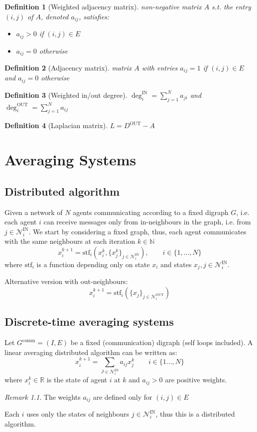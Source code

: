 \documentclass{book}
\newcommand{\R}{\mathbb{R}}
\newcommand{\N}{\mathbb{N}}
\theoremstyle{theoremv2}
\theoremstyle{defv2}
\newtheorem{definition}{Definition}[chapter]
\theoremstyle{remark}
\newtheorem*{remark}{Remark}
\theoremstyle{remark}
\theoremstyle{definition}
\theoremstyle{definition}
\begin{document}
\begin{definition}[Weighted adjacency matrix]
    non-negative matrix $A$ s.t. the entry $(i,j)$ of $A$, denoted $a_{ij}$, satisfies:
    \begin{itemize}
        \item $a_{ij} > 0$ if $(i,j)\in E$
        \item $a_{ij} = 0$ otherwise
    \end{itemize}
\end{definition}
\begin{definition}[Adjacency matrix]
    matrix $A$ with entries $a_{ij}=1$ if $(i,j)\in E$ and $a_{ij}=0$ otherwise
\end{definition}
\begin{definition}[Weighted in/out degree]
    $\deg_i^\text{IN} = \displaystyle\sum_{j=1}^{N} a_{ji}$ and $\deg_i^\text{OUT} = \displaystyle\sum_{j=1}^{N} a_{ij}$
\end{definition}
\begin{definition}[Laplacian matrix]
    $L = D^\text{OUT} - A$
\end{definition}

\chapter{Averaging Systems}
\section{Distributed algorithm}
Given a network of $N$ agents communicating according to a fixed digraph $G$, i.e. each agent $i$ can receive messages only from in-neighbours in the graph, i.e. from $j\in\mathcal{N}_i^{\text{IN}}$. 
We start by considering a fixed graph, thus, each agent communicates with the same neighbours at each iteration $k\in\N$
\[
    x_i^{k+1}=\text{stf}_i(x_i^k,\{x_j^k\}_{j\in\mathcal{N}_i^{\text{IN}}}), \qquad i\in\{1,\dots,N\}
\]
where $\text{stf}_i$ is a function depending only on state $x_i$ and states $x_j,j\in\mathcal{N}_i^{\text{IN}}$.

Alternative version with out-neighbours:
\[
    x_i^{k+1}=\text{stf}_i(\{x_j\}_{j\in\mathcal{N}_i^{\text{OUT}}})
\]
\section{Discrete-time averaging systems}
Let $G^{\text{comm}}=(I,E)$ be a fixed (communication) digraph (self loops included). A linear averaging distributed algorithm can be written as:
\[
    x_i^{k+1}=\displaystyle\sum_{J\in\mathcal{N}_i^{\text{IN}}}a_{ij}x_j^k \qquad i\in\{1\dots,N\}
\]
where $x_i^k\in\R$ is the state of agent $i$ at $k$ and $a_{ij}>0$ are positive weights. 
\begin{remark}
    The weights $a_{ij}$ are defined only for $(i,j)\in E$
\end{remark}
Each $i$ uses only the states of neighbours $j\in\mathcal{N}_i^{\text{IN}}$, thus this is a distributed algorithm.
\end{document}

